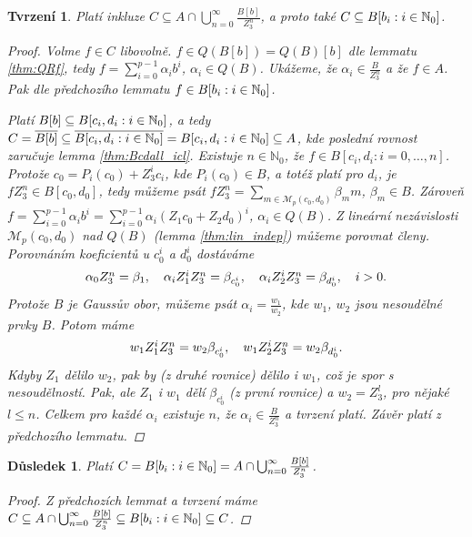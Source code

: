 \documentclass[11pt,a4paper]{article}
\newcommand\m[1]{\mathbb { #1 }} %
\newcommand\p[1]{\mathcal{ #1 }} %
\newcommand\N{\m N}
\newcommand*{\ml}[1]{\[\textstyle\let\displaystyle\textstyle#1\]}	%
\let \icl \overline %
\newcounter{numb}
\theoremstyle{definition}
\theoremstyle{plain}
\newtheorem{tvrzeni}[numb]{Tvrzení}
\newtheorem{dusledek}[numb]{Důsledek}
\begin{document}
\begin{tvrzeni}
	Platí inkluze $C \subseteq A \cap \bigcup_{n = 0}^\infty \frac{B[b]}{Z_3^n}$, a proto také $C \subseteq \Ball$.

	\begin{proof}
		\newcommand*{\I}{_{i = 0}^{p - 1}}
		
		Volme $f \in C$ libovolně. $f \in Q(B[b]) = Q(B)[b]$ dle lemmatu \ref{thm:QRf}, tedy $f = \sum\I \alpha_i b^i$, $\alpha_i \in Q(B)$. Ukážeme, že $\alpha_i \in \frac{B}{Z_3^n}$ a že $f \in A$. Pak dle předchozího lemmatu $f \in \Ball$.
		
		Platí $B[b] \subseteq \Bcdall$, a tedy $C = \icl{B[b]} \subseteq \icl{\Bcdall} = \Bcdall \subseteq A$, kde poslední rovnost zaručuje lemma \ref{thm:Bcdall_icl}. Existuje $n \in \N_0$, že $f \in B[c_i, d_i: i = 0, \hdots, n]$. Protože $c_0 = P_i(c_0) + Z_3^i c_i$, kde $P_i(c_0) \in B$, a totéž platí pro $d_i$, je $f Z_3^n \in B[c_0, d_0]$, tedy můžeme psát $f Z_3^n = \sum_{m \in \p M_p(c_0, d_0)} \beta_m m$, $\beta_m \in B$. Zároveň $f = \sum\I \alpha_i b^i = \sum\I \alpha_i (Z_1 c_0 + Z_2 d_0)^i$, $\alpha_i \in Q(B)$. Z lineární nezávislosti $\p M_p(c_0, d_0)$ nad $Q(B)$ (lemma \ref{thm:lin_indep}) můžeme porovnat členy. Porovnáním koeficientů u $c_0^i$ a $d_0^i$ dostáváme
		\ml{
			\alpha_0 Z_3^n = \beta_1, \quad \alpha_i Z_1^i Z_3^n = \beta_{c_0^i}, \quad \alpha_i Z_2^i Z_3^n = \beta_{d_0^i}, \quad i > 0.
		}
		Protože $B$ je Gaussův obor, můžeme psát $\alpha_i = \frac{w_1}{w_2}$, kde $w_1$, $w_2$ jsou nesoudělné prvky $B$. Potom máme
		\ml{
			w_1 Z_1^i Z_3^n = w_2 \beta_{c_0^i}, \quad w_1 Z_2^i Z_3^n = w_2 \beta_{d_0^i}.
		}
		Kdyby $Z_1$ dělilo $w_2$, pak by (z druhé rovnice) dělilo i $w_1$, což je spor s nesoudělností. Pak, ale $Z_1$ i $w_1$ dělí $\beta_{c_0^i}$ (z první rovnice) a $w_2 = Z_3^l$, pro nějaké $l \leq n$. Celkem pro každé $\alpha_i$ existuje $n$, že $\alpha_i \in \frac{B}{Z_3^n}$ a tvrzení platí. Závěr platí z předchozího lemmatu.
	\end{proof}
\end{tvrzeni}

\begin{dusledek}
	Platí $C = \Ball = A \cap \bigcup_{n = 0}^\infty \frac{B[b]}{Z_3^n}$.
	
	\begin{proof}
		Z předchozích lemmat a tvrzení máme $C \subseteq A \cap \bigcup_{n = 0}^\infty \frac{B[b]}{Z_3^n} \subseteq \Ball \subseteq C$.
	\end{proof}
\end{dusledek}
\end{document}
